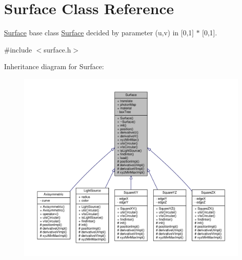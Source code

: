 \hypertarget{classSurface}{}\section{Surface Class Reference}
\label{classSurface}


\hyperlink{classSurface}{Surface} base class \hyperlink{classSurface}{Surface} decided by parameter (u,v) in \mbox{[}0,1\mbox{]} $\ast$ \mbox{[}0,1\mbox{]}.  




{\ttfamily \#include $<$surface.\+h$>$}



Inheritance diagram for Surface\+:
\nopagebreak
\begin{figure}[H]
\begin{center}
\leavevmode
\includegraphics[width=350pt]{classSurface__inherit__graph}
\end{center}
\end{figure}


